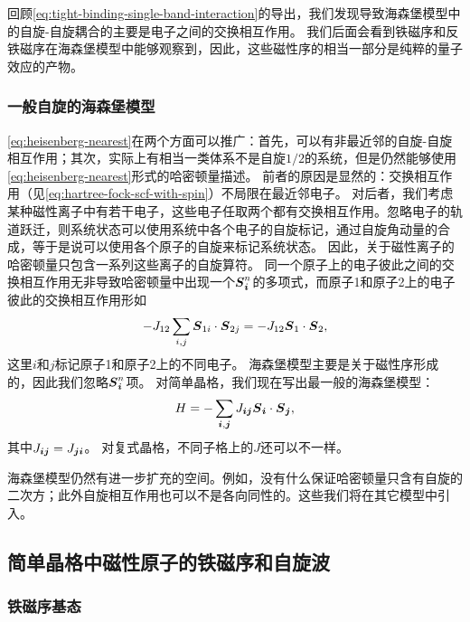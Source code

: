 回顾\eqref{eq:tight-binding-single-band-interaction}的导出，我们发现导致海森堡模型中的自旋-自旋耦合的主要是电子之间的交换相互作用。
我们后面会看到铁磁序和反铁磁序在海森堡模型中能够观察到，因此，这些磁性序的相当一部分是纯粹的量子效应的产物。

\subsubsection{一般自旋的海森堡模型}

\eqref{eq:heisenberg-nearest}在两个方面可以推广：首先，可以有非最近邻的自旋-自旋相互作用；其次，实际上有相当一类体系不是自旋$1/2$的系统，但是仍然能够使用\eqref{eq:heisenberg-nearest}形式的哈密顿量描述。
前者的原因是显然的：交换相互作用（见\eqref{eq:hartree-fock-scf-with-spin}）不局限在最近邻电子。
对后者，我们考虑某种磁性离子中有若干电子，这些电子任取两个都有交换相互作用。忽略电子的轨道跃迁，则系统状态可以使用系统中各个电子的自旋标记，通过自旋角动量的合成，等于是说可以使用各个原子的自旋来标记系统状态。
因此，关于磁性离子的哈密顿量只包含一系列这些离子的自旋算符。
同一个原子上的电子彼此之间的交换相互作用无非导致哈密顿量中出现一个$\vb*{S}_{\vb*{i}}^n$的多项式，而原子1和原子2上的电子彼此的交换相互作用形如
\[
    - J_{12} \sum_{i, j} \vb*{S}_{1i} \cdot \vb*{S}_{2j} = - J_{12} \vb*{S}_1 \cdot \vb*{S}_2,
\]
这里$i$和$j$标记原子1和原子2上的不同电子。
海森堡模型主要是关于磁性序形成的，因此我们忽略$\vb*{S}_{\vb*{i}}^n$项。
对简单晶格，我们现在写出最一般的海森堡模型：
\begin{equation}
    H = - \sum_{\vb*{i}, \vb*{j}} J_{\vb*{i} \vb*{j}} \vb*{S}_{\vb*{i}} \cdot \vb*{S}_{\vb*{j}},
\end{equation}
其中$J_{\vb*{i} \vb*{j}} = J_{\vb*{j} \vb*{i}}$。
对复式晶格，不同子格上的$J$还可以不一样。

海森堡模型仍然有进一步扩充的空间。例如，没有什么保证哈密顿量只含有自旋的二次方；此外自旋相互作用也可以不是各向同性的。这些我们将在其它模型中引入。

\subsection{简单晶格中磁性原子的铁磁序和自旋波}

\subsubsection{铁磁序基态}

